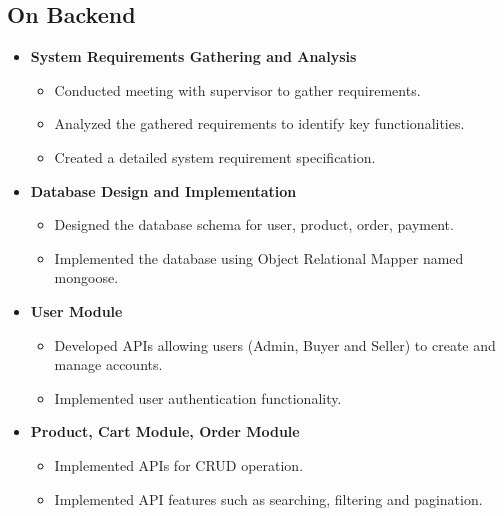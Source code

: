 \documentclass[12pt, a4paper, oneside]{article}
\begin{document}
  \subsection{ On Backend }
   \begin{itemize}
     \item \textbf{System Requirements Gathering and Analysis }
      \begin{itemize}
      
       \item{Conducted meeting with supervisor to gather requirements.}
       \item{Analyzed the gathered requirements to identify key functionalities.}
       \item{Created a detailed system requirement specification.}
       
       \end{itemize}
       
        \item \textbf{Database Design and Implementation}
      \begin{itemize}
         \item{Designed the database schema for user, product, order, payment.}
         \item{Implemented the database using Object Relational Mapper named mongoose.}
         

       \end{itemize} 
     \item \textbf{User Module}
       \begin{itemize}
          \item{Developed APIs allowing users (Admin, Buyer and Seller) to create and manage accounts.}
          \item{Implemented user authentication functionality.}
       \end{itemize}
       
    \item \textbf{Product, Cart Module, Order Module}
       \begin{itemize}
           \item{Implemented APIs for CRUD operation.}
           \item{Implemented API features such as searching, filtering and pagination.}
           
       \end{itemize}
     
   \end{itemize}
  
\end{document}
